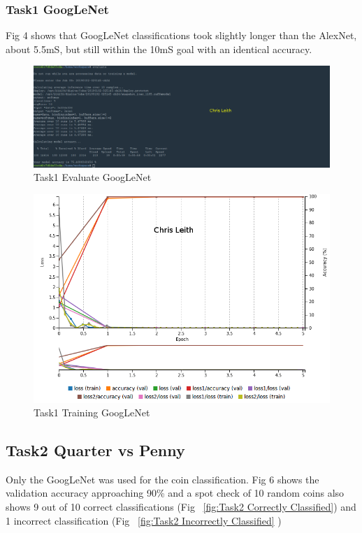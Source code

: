 \documentclass[10pt,journal,compsoc]{IEEEtran}
\begin{document}
\subsubsection{Task1 GoogLeNet}
Fig 4 shows that GoogLeNet classifications took slightly longer than the AlexNet, about 5.5mS, but still within the 10mS goal with an identical accuracy.

\begin{figure}[h]
      \centering
      \includegraphics[width=\linewidth]{Assets/screenshots/Screenshot_2019-01-01_P2_google03_adam_E5_accuracy.png}
      \caption{Task1 Evaluate GoogLeNet }
      \label{fig:Task1 Evaluate GoogLeNet}
\end{figure}


\begin{figure}[h]
      \centering
      \includegraphics[width=\linewidth]{Assets/screenshots/Screenshot_2019-01-01_P2_google03_adam_E5.png}
      \caption{Task1 Training GoogLeNet }
      \label{fig:Task1 Training GoogLeNet}
\end{figure}


\subsection{Task2 Quarter vs Penny}
Only the GoogLeNet was used for the coin classification. Fig 6 shows the validation accuracy approaching 90\% and a spot check of 10 random coins also shows 9 out of 10 correct classifications (Fig ~\ref{fig:Task2 Correctly Classified}) and 1 incorrect classification (Fig ~\ref{fig:Task2 Incorrectly Classified} )
\end{document}
